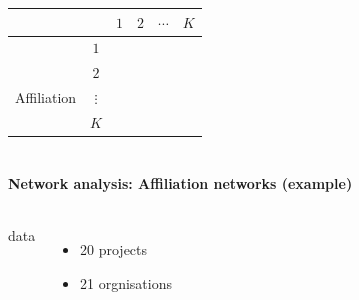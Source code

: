 \documentclass[8pt]{beamer}
\begin{document}
\begin{frame}
\begin{columns}[c]
{\begin{tabular}{lccccc}
        &        & $1$ & $2$ & $\cdots$ & $K$\\
\hline
        &    $1$           \\
        &    $2$           \\
Affiliation    &    $\vdots$      \\
        &    $K$           \\
\bottomrule
\end{tabular}}

\end{columns}


\end{frame}


\begin{frame}[fragile]
\frametitle{\insertsection}
\framesubtitle{Network analysis: Affiliation networks (example)}

\begin{columns}[c]

\begin{minipage}[c][.5\textheight][c]{\linewidth}


{\color{blue}{R\&D projects}} data
\begin{itemize}
\item 20 projects
\item 21 orgnisations
\end{itemize}

\medskip
\medskip

\end{minipage}	   



\end{columns}
\end{frame}
\end{document}
